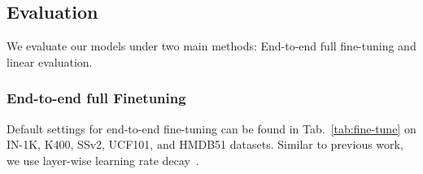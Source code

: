 \begin{table*}[!h]
\centering
\scriptsize
{}

\caption{Comparison with state-of-the-art methods on UCF101 and HMDB51 forVideo Retrieval. ‘V’ refers to visual, ‘A’ is audio, ‘T’ is text narration, and ‘I’ is the image. The best and second best results are shown in \textcolor{red}{red} and \textcolor{blue}{blue} colours, respectively.}
\label{tab:video_Retrival}
\end{table*}

\subsection{Evaluation}
We evaluate our models under two main methods: End-to-end full fine-tuning and linear evaluation.

\subsubsection{End-to-end full Finetuning} 
Default settings for end-to-end fine-tuning can be found in Tab.~\ref{tab:fine-tune} on IN-1K, K400, SSv2, UCF101, and HMDB51 datasets. Similar to previous work, we use layer-wise learning rate decay~\cite{he2022masked}.

